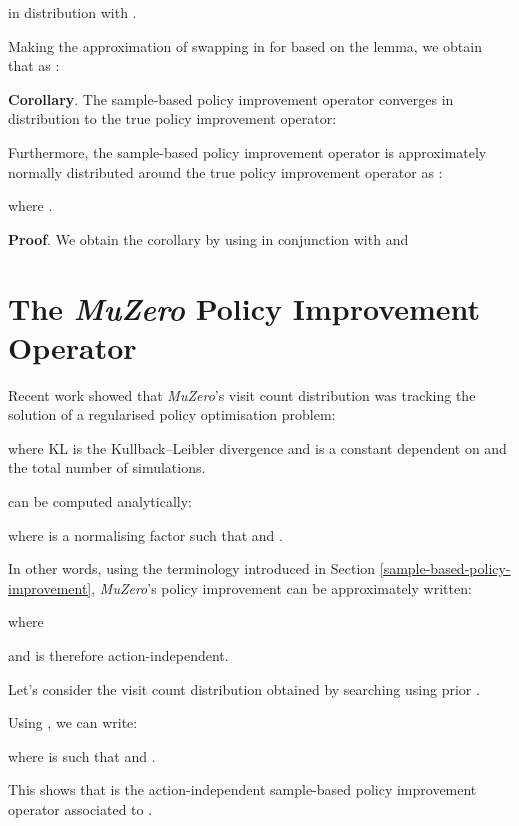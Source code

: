 \documentclass{article}
\newcommand{\muzero}{\emph{MuZero}}
\begin{document}
in distribution with .

Making the approximation of swapping in  for  based on the lemma, we obtain that as :


\textbf{Corollary}.
The sample-based policy improvement operator converges in distribution to the true policy improvement operator:


Furthermore, the sample-based policy improvement operator is approximately normally distributed around the true policy improvement operator as :

where .

\textbf{Proof}. We obtain the corollary by using  in conjunction with
 and 

\section{The \muzero{} Policy Improvement Operator}
\label{mz-pi}
Recent work \cite{grill2020montecarlo} showed that \muzero{}'s visit count distribution was tracking the solution  of a regularised policy optimisation problem:

where KL is the Kullback–Leibler divergence and  is a constant dependent on  and the total number  of simulations.

 can be computed analytically:

where  is a normalising factor such that  and .

In other words, using the terminology introduced in Section \ref{sample-based-policy-improvement}, \muzero{}'s policy improvement can be approximately written:

where

and is therefore action-independent.

Let's consider the visit count distribution  obtained by searching using prior .

Using \cite{grill2020montecarlo}, we can write:

where  is such that  and .

This shows that  is the action-independent sample-based policy improvement operator associated to .
\end{document}
